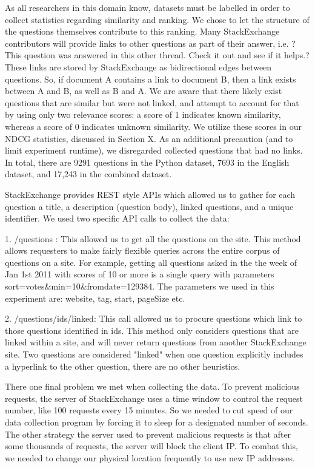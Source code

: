 \documentclass{acm_proc_article-sp}
\begin{document}
As all researchers in this domain know, datasets must be labelled in order to collect statistics regarding similarity and ranking. We chose to let the structure of the questions themselves contribute to this ranking. Many StackExchange contributors will provide links to other questions as part of their answer, i.e. ?This question was answered in this other thread. Check it out and see if it helps.? These links are stored by StackExchange as bidirectional edges between questions. So, if document A contains a link to document B, then a link exists between A and B, as well as B and A. We are aware that there likely exist questions that are similar but were not linked, and attempt to account for that by using only two relevance scores: a score of 1 indicates known similarity, whereas a score of 0 indicates unknown similarity. We utilize these scores in our NDCG statistics, discussed in Section X. As an additional precaution (and to limit experiment runtime), we disregarded collected questions that had no links. In total, there are 9291 questions in the Python dataset, 7693 in the English dataset, and 17,243 in the combined dataset. 

StackExchange provides REST style APIs which allowed us to gather for each question a title, a description (question body), linked questions, and a unique identifier. We used two specific API calls to collect the data:

1. /questions : This allowed us to get all the questions on the site. This method allows requesters to make fairly flexible queries across the entire corpus of questions on a site. For example, getting all questions asked in the the week of Jan 1st 2011 with scores of 10 or more is a single query with parameters sort=votes\&min=10\&fromdate=129384. The parameters we used in this experiment are: website, tag, start, pageSize  etc. 

2. /questions/{ids}/linked:  This call allowed us to procure questions which link to those questions identified in {ids}.  This method only considers questions that are linked within a site, and will never return questions from another StackExchange site. Two questions are considered "linked" when one question explicitly includes a hyperlink to the other question, there are no other heuristics.

There one final problem we met when collecting the data. To prevent malicious requests,  the server of StackExchange uses a time window to control the request number, like  100 requests every 15 minutes. So we needed to cut speed of our data collection program by forcing it to sleep for a designated number of seconds. The other strategy the server used to prevent malicious requests is that after some thousands of requests, the server will block the client IP. To combat this, we needed to change our physical location frequently to use new IP addresses.
\end{document}
